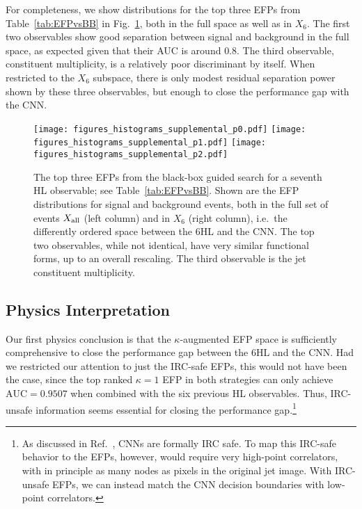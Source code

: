 \documentclass[aps,prd,twocolumn,superscriptaddress,preprintnumbers,nofootinbib,longbibliography,floatfix]{revtex4-1}
\newcommand{\AUC}{\text{AUC}}
\newcommand{\rref}[1]{Ref.~\cite{#1}}
\newcommand{\Fig}[1]{Fig.~\ref{#1}}
\newcommand{\Tab}[1]{Table~\ref{#1}}
\begin{document}
For completeness, we show distributions for the top three EFPs from \Tab{tab:EFPvsBB} in \Fig{fig:efp_dist}, both in the full space as well as in $X_6$. The first two observables show good separation between signal and background in the full space, as expected given that their AUC is around $0.8$. The third observable, constituent multiplicity, is a relatively poor discriminant by itself. When restricted to the $X_6$ subspace, there is only modest residual separation power shown by these three observables, but enough to close the performance gap with the CNN.

\begin{figure}[t]
\centering
	\texttt{[image: figures\_histograms\_supplemental\_p0.pdf]}
	\texttt{[image: figures\_histograms\_supplemental\_p1.pdf]}
	\texttt{[image: figures\_histograms\_supplemental\_p2.pdf]}
    \caption{The top three EFPs from the black-box guided search for a seventh HL observable; see Table~\ref{tab:EFPvsBB}. Shown are the EFP distributions for signal and background events, both in the full set of events $X_{\rm all}$ (left column) and in $X_6$ (right column), i.e.\ the differently ordered space between the 6HL and the CNN. The top two observables, while not identical, have very similar functional forms, up to an overall rescaling. The third observable is the jet constituent multiplicity.}
\label{fig:efp_dist}
\end{figure}

\subsection{Physics Interpretation}
\label{subsec:supplementing_interpretation}
Our first physics conclusion is that the $\kappa$-augmented EFP space is sufficiently comprehensive to close the performance gap between the 6HL and the CNN. Had we restricted our attention to just the IRC-safe EFPs, this would not have been the case, since the top ranked $\kappa = 1$ EFP in both strategies can only achieve $\AUC = 0.9507$ when combined with the six previous HL observables. Thus, IRC-unsafe information seems essential for closing the performance gap.\footnote{As discussed in \rref{Choi:2018dag}, CNNs are formally IRC safe.  To map this IRC-safe behavior to the EFPs, however, would require very high-point correlators, with in principle as many nodes as pixels in the original jet image.   With IRC-unsafe EFPs, we can instead match the CNN decision boundaries with low-point correlators.}
\end{document}
